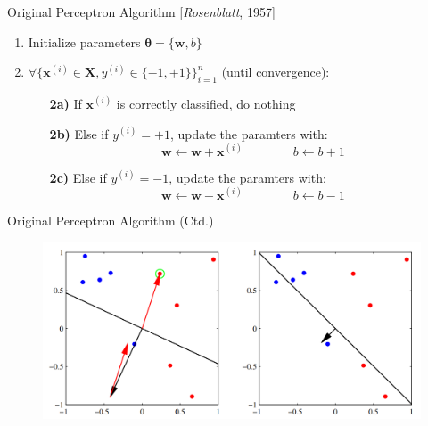 \begin{frame}{Original Perceptron Algorithm [\textit{Rosenblatt}, 1957]}{}
	\begin{enumerate}
		\item Initialize parameters $\bm{\theta} = \{ \bm{w}, b \}$
		\item $\forall \{ \bm{x}^{(i)} \in \bm{X}, y^{(i)} \in \{ -1, +1 \} \}_{i=1}^n$ (until convergence):
		\begin{itemize}
			\item[\textbf{2a)}] If $\bm{x}^{(i)}$ is correctly classified, do nothing
			\item[\textbf{2b)}] Else if $y^{(i)} = +1$, update the paramters with:
			\begin{equation*}
				\bm{w} \longleftarrow \bm{w} + \bm{x}^{(i)} \qquad\qquad b \longleftarrow b + 1
			\end{equation*}
			\item[\textbf{2c)}] Else if $y^{(i)} = -1$, update the paramters with:
			\begin{equation*}
				\bm{w} \longleftarrow \bm{w} - \bm{x}^{(i)} \qquad\qquad b \longleftarrow b - 1
			\end{equation*}
		\end{itemize}
	\end{enumerate}
\end{frame}


\begin{frame}{Original Perceptron Algorithm (Ctd.)}{}
	\begin{figure}
		\centering
		\includegraphics[scale=0.35]{10_deep_learning/02_img/perceptron_1}
	\end{figure}
\end{frame}


